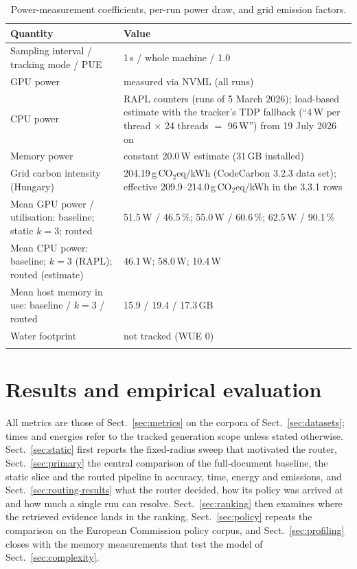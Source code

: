 \documentclass[pdflatex,sn-mathphys-num]{sn-jnl}
\newcommand{\gco}{g\,CO$_2$eq}
\theoremstyle{thmstyleone}%
\theoremstyle{thmstylethree}%
\begin{document}
\begin{table}[htbp]
\caption{Power-measurement coefficients, per-run power draw, and grid emission factors.}\label{tab:power}
\begin{tabular}{@{}p{5.5cm}p{7.1cm}@{}}
\toprule
Quantity & Value \\
\midrule
Sampling interval / tracking mode / PUE & 1\,s / whole machine / 1.0 \\
GPU power & measured via NVML (all runs) \\
CPU power & RAPL counters (runs of 5 March 2026); load-based estimate with the tracker's TDP fallback (``4\,W per thread $\times$ 24 threads $=$ 96\,W'') from 19 July 2026 on \\
Memory power & constant 20.0\,W estimate (31\,GB installed) \\
Grid carbon intensity (Hungary) & 204.19\,\gco{}/kWh (CodeCarbon 3.2.3 data set); effective 209.9--214.0\,\gco{}/kWh in the 3.3.1 rows \\
Mean GPU power / utilisation: baseline; static $k=3$; routed & 51.5\,W / 46.5\,\%; 55.0\,W / 60.6\,\%; 62.5\,W / 90.1\,\% \\
Mean CPU power: baseline; $k=3$ (RAPL); routed (estimate) & 46.1\,W; 58.0\,W; 10.4\,W \\
Mean host memory in use: baseline / $k=3$ / routed & 15.9 / 19.4 / 17.3\,GB \\
Water footprint & not tracked (WUE 0) \\
\botrule
\end{tabular}
\end{table}

\section{Results and empirical evaluation}\label{sec:results}

All metrics are those of Sect.~\ref{sec:metrics} on the corpora of Sect.~\ref{sec:datasets}; times and energies refer to the tracked generation scope unless stated otherwise. Sect.~\ref{sec:static} first reports the fixed-radius sweep that motivated the router, Sect.~\ref{sec:primary} the central comparison of the full-document baseline, the static slice and the routed pipeline in accuracy, time, energy and emissions, and Sect.~\ref{sec:routing-results} what the router decided, how its policy was arrived at and how much a single run can resolve. Sect.~\ref{sec:ranking} then examines where the retrieved evidence lands in the ranking, Sect.~\ref{sec:policy} repeats the comparison on the European Commission policy corpus, and Sect.~\ref{sec:profiling} closes with the memory measurements that test the model of Sect.~\ref{sec:complexity}.
\end{document}
